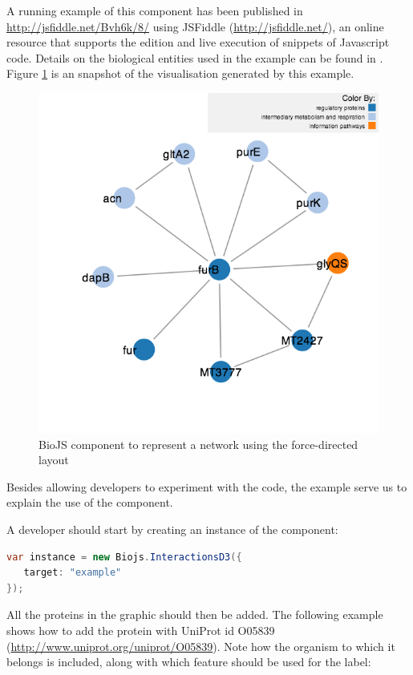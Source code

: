 A running example of this component has been published in \url{http://jsfiddle.net/Bvh6k/8/} using JSFiddle (\url{http://jsfiddle.net/}), an online resource that supports the edition and live execution of snippets of Javascript code. Details on the biological entities used in the example can be found in \cite{SAL2014}. Figure \ref{fig:biojs_force} is an snapshot of the visualisation generated by this example. 

\begin{figure}[ht]
\centering
\includegraphics[width=5in]{figures/force.png}
\caption[BioJS component to represent a network using the force-directed layout]{BioJS component to represent a network using the force-directed layout
\label{fig:biojs_force}}
\end{figure}

Besides allowing developers to experiment with the code, the example serve us to explain the use of the component. 

A developer should start by creating an instance of the component:

\begin{lstlisting}[language=java]
var instance = new Biojs.InteractionsD3({
   target: "example"
});
\end{lstlisting}
					
All the proteins in the graphic should then be added. The following example shows how to add the protein with UniProt id O05839 (\url{http://www.uniprot.org/uniprot/O05839}). Note how the organism to which it belongs is included, along with which feature should be used for the label:

